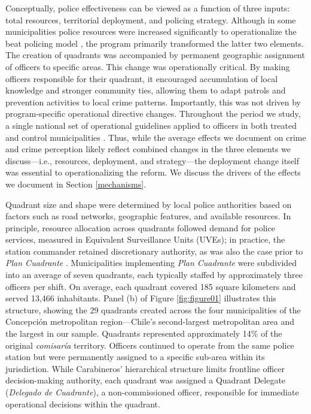 \FloatBarrier

\FloatBarrier

Conceptually, police effectiveness can be viewed as a function of three inputs: total resources, territorial deployment, and policing strategy. Although in some municipalities police resources were increased significantly to operationalize the beat policing model \citep{DIPRES2007_largo,DIPRES2014}, the program primarily transformed the latter two elements. The creation of quadrants was accompanied by permanent geographic assignment of officers to specific areas. This change was operationally critical. By making officers responsible for their quadrant, it encouraged accumulation of local knowledge and stronger community ties, allowing them to adapt patrols and prevention activities to local crime patterns. Importantly, this was not driven by program-specific operational directive changes. Throughout the period we study, a single national set of operational guidelines applied to officers in both treated and control municipalities \citep{Manual_Carabineros2018,DIPRES2007_largo}. Thus, while the average effects we document on crime and crime perception likely reflect combined changes in the three elements we discuss---i.e., resources, deployment, and strategy---the deployment change itself was essential to operationalizing the reform. We discuss the drivers of the effects we document in Section \ref{mechanisms}.

Quadrant size and shape were determined by local police authorities based on factors such as road networks, geographic features, and available resources. In principle, resource allocation across quadrants followed demand for police services, measured in Equivalent Surveillance Units (UVEs); in practice, the station commander retained discretionary authority, as was also the case prior to \emph{Plan Cuadrante} \citep{DIPRES2014}. Municipalities implementing \emph{Plan Cuadrante} were subdivided into an average of seven quadrants, each typically staffed by approximately three officers per shift. On average, each quadrant covered 185 square kilometers and served 13,466 inhabitants. Panel (b) of Figure \ref{fig:figure01} illustrates this structure, showing the 29 quadrants created across the four municipalities of the Concepción metropolitan region---Chile's second-largest metropolitan area and the largest in our sample. Quadrants represented approximately 14\% of the original \emph{comisar\'ia} territory. Officers continued to operate from the same police station but were permanently assigned to a specific sub-area within its jurisdiction. While Carabineros' hierarchical structure limits frontline officer decision-making authority, each quadrant was assigned a Quadrant Delegate (\textit{Delegado de Cuadrante}), a non-commissioned officer, responsible for immediate operational decisions within the quadrant.


